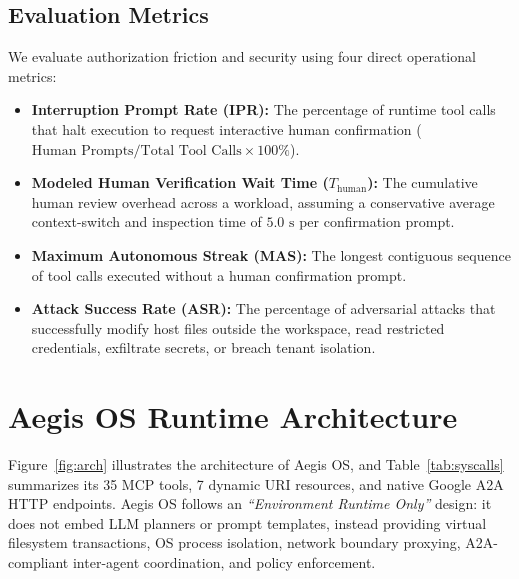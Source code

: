 \documentclass[10pt,twocolumn]{article}
\begin{document}
\subsection{Evaluation Metrics}

We evaluate authorization friction and security using four direct operational metrics:
\begin{itemize}
    \item \textbf{Interruption Prompt Rate (IPR):} The percentage of runtime tool calls that halt execution to request interactive human confirmation ($\text{Human Prompts} / \text{Total Tool Calls} \times 100\%$).
    \item \textbf{Modeled Human Verification Wait Time ($T_{\text{human}}$):} The cumulative human review overhead across a workload, assuming a conservative average context-switch and inspection time of $5.0\text{ s}$ per confirmation prompt.
    \item \textbf{Maximum Autonomous Streak (MAS):} The longest contiguous sequence of tool calls executed without a human confirmation prompt.
    \item \textbf{Attack Success Rate (ASR):} The percentage of adversarial attacks that successfully modify host files outside the workspace, read restricted credentials, exfiltrate secrets, or breach tenant isolation.
\end{itemize}

\section{Aegis OS Runtime Architecture}
\label{sec:arch}

Figure~\ref{fig:arch} illustrates the architecture of Aegis OS, and Table~\ref{tab:syscalls} summarizes its 35 MCP tools, 7 dynamic URI resources, and native Google A2A HTTP endpoints. Aegis OS follows an \emph{``Environment Runtime Only''} design: it does not embed LLM planners or prompt templates, instead providing virtual filesystem transactions, OS process isolation, network boundary proxying, A2A-compliant inter-agent coordination, and policy enforcement.
\end{document}
